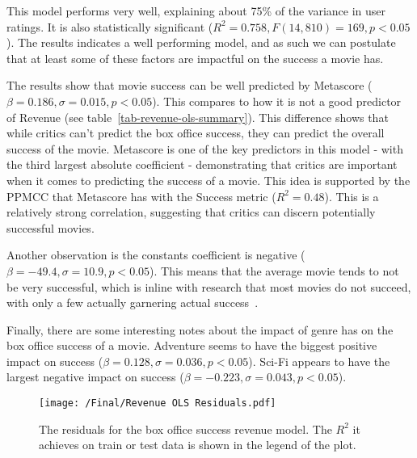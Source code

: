         \begin{multicols}{2}
            This model performs very well, explaining about 75\% of the variance in user
                ratings.
            It is also statistically significant ($R^2=0.758, F(14,810)=169, p<0.05$).
            The results indicates a well performing model, and as such we can postulate
                that at least some of these factors are impactful on the success a movie has.

            The results show that movie success can be well predicted by Metascore
                ($\beta=0.186, \sigma=0.015, p<0.05$).
            This compares to how it is not a good predictor of Revenue (see
                table~\ref{tab-revenue-ols-summary}).
            This difference shows that while critics can't predict the box office success,
                they can predict the overall success of the movie.
            Metascore is one of the key predictors in this model - with the third largest
                absolute coefficient - demonstrating that critics are important when it comes
                to predicting the success of a movie.
            This idea is supported by the PPMCC that Metascore has with the Success metric
                ($R^2=0.48$).
            This is a relatively strong correlation, suggesting that critics can discern
                potentially successful movies.

            Another observation is the constants coefficient is negative
                ($\beta=-49.4,\sigma=10.9,p<0.05$).
            This means that the average movie tends to not be very successful, which is
                inline with research that most movies do not succeed, with only a few actually
                garnering actual success~\cite{walls2005modelling}.

            Finally, there are some interesting notes about the impact of genre has on the
                box office success of a movie.
            Adventure seems to have the biggest positive impact on success
                ($\beta=0.128,\sigma=0.036,p<0.05$).
            Sci-Fi appears to have the largest negative impact on success
                ($\beta=-0.223,\sigma=0.043,p<0.05$).

            \begin{figure}[H]
                \texttt{[image: /Final/Revenue OLS Residuals.pdf]}
                \caption[short]{The residuals for the box office success revenue model. 
                                The $R^2$ it achieves on train or test data is shown in
                                the legend of the plot.}\label{fig-revenue-ols-residuals}
            \end{figure}


\end{multicols}
